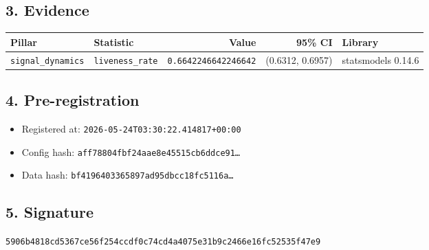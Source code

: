 \documentclass{article}
\begin{document}
\subsection*{3. Evidence}
\begin{tabular}{llrrl}\toprule
\textbf{Pillar} & \textbf{Statistic} & \textbf{Value} & \textbf{95\% CI} & \textbf{Library} \\\midrule
\texttt{signal\_dynamics} & \texttt{liveness\_rate} & \texttt{0.6642246642246642} & (0.6312, 0.6957) & statsmodels 0.14.6 \\
\bottomrule\end{tabular}
\subsection*{4. Pre-registration}
\begin{itemize}
\item Registered at: \texttt{2026-05-24T03:30:22.414817+00:00}
\item Config hash: \texttt{aff78804fbf24aae8e45515cb6ddce91\dots}
\item Data hash: \texttt{bf4196403365897ad95dbcc18fc5116a\dots}
\end{itemize}
\subsection*{5. Signature}
\texttt{5906b4818cd5367ce56f254ccdf0c74cd4a4075e31b9c2466e16fc52535f47e9}\\
\end{document}
